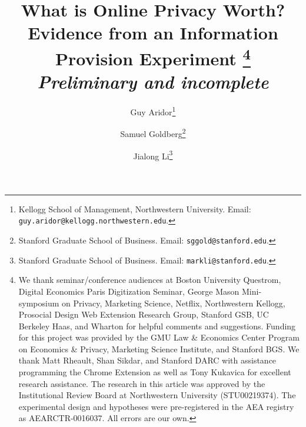 \documentclass[12pt]{article}
\theoremstyle{definition}
\theoremstyle{remark}
\begin{document}
\title{What is Online Privacy Worth? Evidence from an Information Provision Experiment%
\thanks{We thank seminar/conference audiences at Boston University Questrom, Digital Economics Paris Digitization Seminar, George Mason Mini-symposium on Privacy, Marketing Science, Netflix, Northwestern Kellogg, Prosocial Design Web Extension Research Group, Stanford GSB, UC Berkeley Haas, and Wharton for helpful comments and suggestions. Funding for this project was provided by the GMU Law \& Economics Center Program on Economics \& Privacy, Marketing Science Institute, and Stanford BGS. We thank Matt Rheault, Shan Sikdar, and Stanford DARC with assistance programming the Chrome Extension as well as Tony Kukavica for excellent research assistance. The research in this article was approved by the Institutional Review Board at Northwestern University (STU00219374). The experimental design and hypotheses were pre-registered in the AEA registry as AEARCTR-0016037. All errors are our own.} \\
\textit{\normalsize Preliminary and incomplete}
}

\author{
Guy Aridor\thanks{Kellogg School of Management, Northwestern University. 
Email: \texttt{guy.aridor@kellogg.northwestern.edu}.}
\and
Samuel Goldberg\thanks{Stanford Graduate School of Business. 
Email: \texttt{sggold@stanford.edu}.}
\and
Jialong Li\thanks{Stanford Graduate School of Business. 
Email: \texttt{markli@stanford.edu}.}
}

\maketitle
\thispagestyle{empty}
\end{document}
